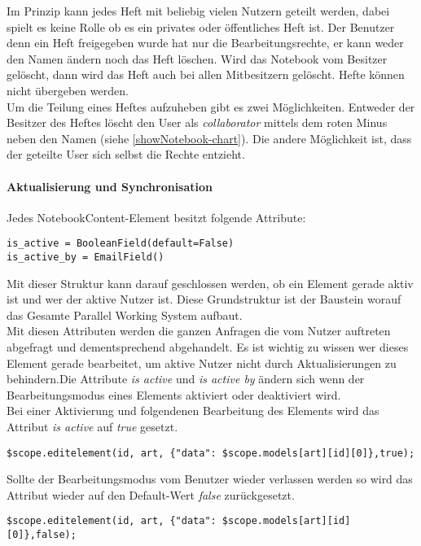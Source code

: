 
Im Prinzip kann jedes Heft mit beliebig vielen Nutzern geteilt werden, dabei spielt es keine Rolle ob es ein privates oder öffentliches Heft ist. 
Der Benutzer denn ein Heft freigegeben wurde hat nur die Bearbeitungsrechte, er kann weder den Namen ändern noch das Heft löschen. Wird das Notebook vom Besitzer gelöscht, dann wird das Heft auch bei allen Mitbesitzern gelöscht. Hefte können nicht übergeben werden.
\\
Um die Teilung eines Heftes aufzuheben gibt es zwei Möglichkeiten. Entweder der Besitzer des Heftes löscht den User als \textit{collaborator} mittels dem roten Minus neben den Namen (siehe \ref{showNotebook-chart}). Die andere Möglichkeit ist, dass der geteilte User sich selbst die Rechte entzieht.
\paragraph{Aktualisierung und Synchronisation}
Jedes NotebookContent-Element besitzt folgende Attribute:
\begin{lstlisting}[caption={Parallel Working System Attribute}]
is_active = BooleanField(default=False)
is_active_by = EmailField()
\end{lstlisting}
Mit dieser Struktur kann darauf geschlossen werden, ob ein Element gerade aktiv ist und wer der aktive Nutzer ist. Diese Grundstruktur ist der Baustein worauf das Gesamte Parallel Working System aufbaut.\\
Mit diesen Attributen werden die ganzen Anfragen die vom Nutzer auftreten abgefragt und dementsprechend abgehandelt. Es ist wichtig zu wissen wer dieses Element gerade bearbeitet, um aktive Nutzer nicht durch Aktualisierungen zu behindern.Die Attribute \textit{is active} und \textit{is active by} ändern sich wenn der Bearbeitungsmodus eines Elements aktiviert oder deaktiviert wird.\\

Bei einer Aktivierung und folgendenen Bearbeitung des Elements wird das Attribut \textit{is active} auf \textit{true} gesetzt.
\begin{lstlisting}[caption={Bearbeitungsmodus true - PWS}]
$scope.editelement(id, art, {"data": $scope.models[art][id][0]},true);
\end{lstlisting}

Sollte der Bearbeitungsmodus vom Benutzer wieder verlassen werden so wird das Attribut wieder auf den Default-Wert \textit{false} zurückgesetzt.
\begin{lstlisting}[caption={Bearbeitungsmodus false - PWS}]
$scope.editelement(id, art, {"data": $scope.models[art][id][0]},false);
\end{lstlisting}

